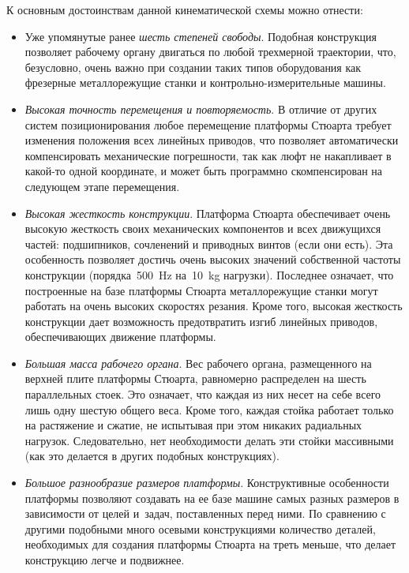 К основным достоинствам данной кинематической схемы можно отнести:
\begin{itemize}
	\item Уже упомянутые ранее \textit{шесть степеней свободы}. Подобная конструкция позволяет рабочему органу двигаться по любой трехмерной траектории, что, безусловно, очень важно при создании таких типов оборудования как фрезерные металлорежущие станки и контрольно-измерительные машины.
	
	\item \textit{Высокая точность перемещения и повторяемость}. В отличие от других систем позиционирования любое перемещение платформы Стюарта требует изменения положения всех линейных приводов, что позволяет автоматически компенсировать механические погрешности, так как люфт не накапливает в какой-то одной координате, и может быть программно скомпенсирован на следующем этапе перемещения.
	
	\item \textit{Высокая жесткость конструкции}. Платформа Стюарта обеспечивает очень высокую жесткость своих механических компонентов и всех движущихся частей: подшипников, сочленений и приводных винтов (если они есть). Эта особенность позволяет достичь очень высоких значений собственной частоты конструкции (порядка~\SI{500}{\hertz} на~\SI{10}{\kilogram} нагрузки). Последнее означает, что построенные на базе платформы Стюарта металлорежущие станки могут работать на очень высоких скоростях резания. Кроме того, высокая жесткость конструкции дает возможность предотвратить изгиб линейных приводов, обеспечивающих движение платформы.
	
	\item \textit{Большая масса рабочего органа}. Вес рабочего органа, размещенного на верхней плите платформы Стюарта, равномерно распределен на шесть параллельных стоек. Это означает, что каждая из них несет на себе всего лишь одну шестую общего веса. Кроме того, каждая стойка работает только на растяжение и сжатие, не испытывая при этом никаких радиальных нагрузок. Следовательно, нет необходимости делать эти стойки массивными (как это делается в других подобных конструкциях).
	
	\item \textit{Большое разнообразие размеров платформы}. Конструктивные особенности платформы позволяют создавать на ее базе машине самых разных размеров в зависимости от целей и~задач, поставленных перед ними. По сравнению с другими подобными много осевыми конструкциями количество деталей, необходимых для создания платформы Стюарта на треть меньше, что делает конструкцию легче и подвижнее.
	
	
\end{itemize}
